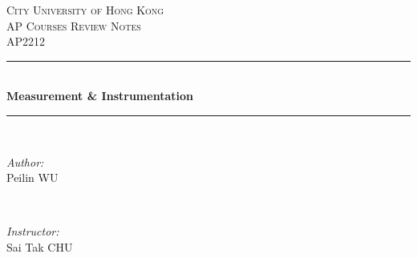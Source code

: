 \begin{titlepage}
\newcommand{\HRule}{\rule{\linewidth}{0.5mm}} %

\center %


\textsc{\LARGE City University of Hong Kong}\\[1.5cm] %
\textsc{\Large AP Courses Review Notes}\\[0.5cm] 		%
\textsc{\large {AP2212}}\\[0.5cm] 						%


\HRule \\[0.4cm]
{ \huge \bfseries  \textsf{ Measurement \& Instrumentation} }\\[0.4cm] %
\HRule \\[1.5cm]


\begin{minipage}{0.4\textwidth}
\begin{flushleft} \large
\emph{Author:}\\
Peilin \textsc{WU}
\end{flushleft}
\end{minipage}
~
\begin{minipage}{0.4\textwidth}
\begin{flushright} \large
\emph{Instructor:} \\
Sai Tak \textsc{CHU} %
\end{flushright}
\end{minipage}\\[2cm]



\end{titlepage}
